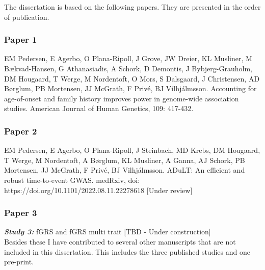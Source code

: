 The dissertation is based on the following papers. They are presented in the order of publication.
\subsubsection{Paper 1}
EM Pedersen, E Agerbo, O Plana-Ripoll, J Grove, JW Dreier, KL Musliner, M Bækvad-Hansen, G Athanasiadis, A Schork, D Demontis, J Bybjerg-Grauholm, DM Hougaard, T Werge, M Nordentoft, O Mors, S Dalsgaard, J Christensen,  AD Børglum, PB Mortensen, JJ McGrath, F Privé, BJ Vilhjálmsson. Accounting for age-of-onset and family history improves power in genome-wide association studies. American Journal of Human Genetics, 109: 417-432.

\subsubsection{Paper 2}
EM Pedersen, E Agerbo, O Plana-Ripoll, J Steinbach, MD Krebs, DM Hougaard, T Werge, M Nordentoft, A Børglum,  KL Musliner, A Ganna, AJ Schork, PB Mortensen,  JJ McGrath,  F Privé, BJ Vilhjálmsson. ADuLT: An efficient and robust time-to-event GWAS. medRxiv, doi: https://doi.org/10.1101/2022.08.11.22278618 [Under review]

\subsubsection{Paper 3}
\textbf{\textit{Study 3:}} fGRS and fGRS multi trait [TBD - Under construction]
\mbox{}\\
Besides these I have contributed to several other manuscripts that are not included in this dissertation. This includes the three published studies and one pre-print.

